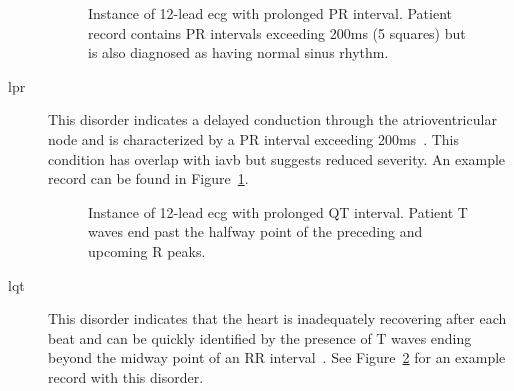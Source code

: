 \documentclass[\main/thesis.tex]{subfiles}
\begin{document}
\begin{description}
    \begin{figure}[H]
        \centering
        \caption{Instance of 12-lead \gls{ecg} with prolonged PR interval. Patient record contains PR intervals exceeding 200ms (5 squares) but is also diagnosed as having normal sinus rhythm.}
        \label{fig:full_LPR}
    \end{figure}
    \item[\gls{lpr}] This disorder indicates a delayed conduction through the atrioventricular node and is characterized by a PR interval exceeding 200ms~\cite{Kwok672}. This condition has overlap with \gls{iavb} but suggests reduced severity.
    An example record can be found in Figure~\ref{fig:full_LPR}.

    \begin{figure}[H]
        \centering
        \caption{Instance of 12-lead \gls{ecg} with prolonged QT interval. Patient T waves end past the halfway point of the preceding and upcoming R peaks.}
        \label{fig:full_LQT}
    \end{figure}
    \item[\gls{lqt}] This disorder indicates that the heart is inadequately recovering after each beat and can be quickly identified by the presence of T waves ending beyond the midway point of an RR interval~\cite{10.1001/jama.1986.03380210081029}.
    See Figure~\ref{fig:full_LQT} for an example record with this disorder.


\end{description}
\end{document}

